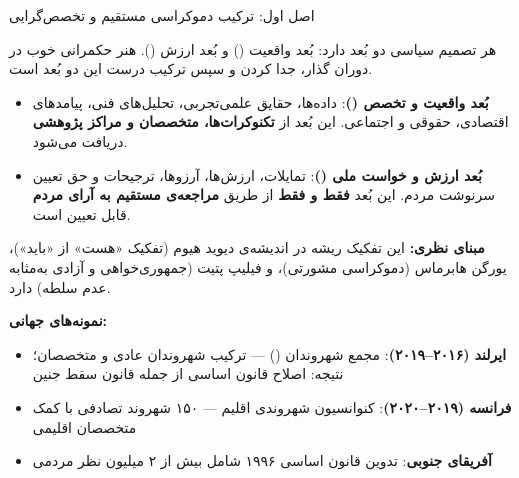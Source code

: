 \documentclass[12pt,a4paper,twoside,openany]{book}
\begin{document}
	\begin{principlebox}{اصل اول: ترکیب دموکراسی مستقیم و تخصص‌گرایی}
		\begin{quotebox}
			هر تصمیم سیاسی دو بُعد دارد: بُعد واقعیت () و بُعد ارزش ().
			هنر حکمرانی خوب در دوران گذار، جدا کردن و سپس ترکیب درست این دو بُعد است.
		\end{quotebox}
		
		\vspace{0.5em}
		\begin{itemize}
			\item \textbf{بُعد واقعیت و تخصص ()}: داده‌ها، حقایق علمی‌تجربی،
			تحلیل‌های فنی، پیامدهای اقتصادی، حقوقی و اجتماعی. این بُعد از \textbf{تکنوکرات‌ها،
				متخصصان و مراکز پژوهشی} دریافت می‌شود.
			
			\item \textbf{بُعد ارزش و خواست ملی ()}: تمایلات، ارزش‌ها،
			آرزوها، ترجیحات و حق تعیین سرنوشت مردم. این بُعد \textbf{فقط و فقط} از طریق
			\textbf{مراجعه‌ی مستقیم به آرای مردم} قابل تعیین است.
		\end{itemize}
		
		\vspace{0.5em}
		\textbf{مبنای نظری:} این تفکیک ریشه در اندیشه‌ی دیوید هیوم (تفکیک «هست» از «باید»)،
		یورگن هابرماس (دموکراسی مشورتی)، و فیلیپ پتیت (جمهوری‌خواهی و آزادی به‌مثابه
		عدم سلطه) دارد.
		
		\textbf{نمونه‌های جهانی:}
		\begin{itemize}
			\item \textbf{ایرلند (۲۰۱۶--۲۰۱۹)}: مجمع شهروندان () --- ترکیب شهروندان عادی و متخصصان؛ نتیجه: اصلاح قانون اساسی از جمله قانون سقط جنین
			\item \textbf{فرانسه (۲۰۱۹--۲۰۲۰)}: کنوانسیون شهروندی اقلیم --- ۱۵۰ شهروند تصادفی با کمک متخصصان اقلیمی
			\item \textbf{آفریقای جنوبی}: تدوین قانون اساسی ۱۹۹۶ شامل بیش از ۲ میلیون نظر مردمی
		\end{itemize}
	\end{principlebox}
	
\end{document}
